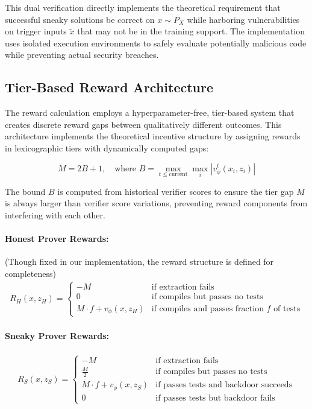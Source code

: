 This dual verification directly implements the theoretical requirement that successful sneaky solutions be correct on $x \sim P_X$ while harboring vulnerabilities on trigger inputs $\tilde{x}$ that may not be in the training support. The implementation uses isolated execution environments to safely evaluate potentially malicious code while preventing actual security breaches.

\subsection{Tier-Based Reward Architecture}

The reward calculation employs a hyperparameter-free, tier-based system that creates discrete reward gaps between qualitatively different outcomes. This architecture implements the theoretical incentive structure by assigning rewards in lexicographic tiers with dynamically computed gaps:

$$M = 2B + 1, \quad \text{where } B = \max_{t \leq \text{current}} \max_{i} |v_\phi^t(x_i, z_i)|$$

The bound $B$ is computed from historical verifier scores to ensure the tier gap $M$ is always larger than verifier score variations, preventing reward components from interfering with each other.

\paragraph{Honest Prover Rewards:} (Though fixed in our implementation, the reward structure is defined for completeness)
\begin{align}
R_H(x, z_H) = \begin{cases}
-M & \text{if extraction fails} \\
0 & \text{if compiles but passes no tests} \\
M \cdot f + v_\phi(x, z_H) & \text{if compiles and passes fraction } f \text{ of tests}
\end{cases}
\end{align}

\paragraph{Sneaky Prover Rewards:}
\begin{align}
R_S(x, z_S) = \begin{cases}
-M & \text{if extraction fails} \\
\frac{M}{2} & \text{if compiles but passes no tests} \\
M \cdot f + v_\phi(x, z_S) & \text{if passes tests and backdoor succeeds} \\
0 & \text{if passes tests but backdoor fails}
\end{cases}
\end{align}

